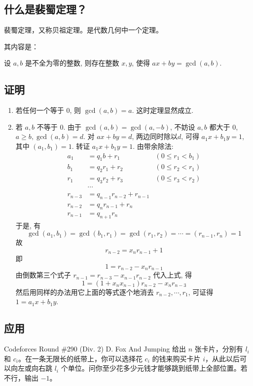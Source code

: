 
\subsection{什么是裴蜀定理？}

裴蜀定理，又称贝祖定理。是代数几何中一个定理。

其内容是：

设 $a,b$ 是不全为零的整数, 则存在整数 $x,y$, 使得 $ax+by=\gcd(a,b)$.

\subsection{证明}

\begin{enumerate}
\item 若任何一个等于 $0$, 则 $\gcd(a,b)=a$. 这时定理显然成立.
\item 若 $a,b$ 不等于 $0$.
由于 $\gcd(a,b)=\gcd(a,-b)$,
不妨设 $a,b$ 都大于 $0$, $a\geq b,\gcd(a,b)=d$.
对 $ax+by=d$, 两边同时除以$d$, 可得 $a_1x+b_1y=1$, 其中 $(a_1,b_1)=1$.
转证 $a_1x+b_1y=1$. 由带余除法:
$$
\begin{aligned}a_1 &= q_1b+r_1 &(0\leq r_1<b_1) \\ b_1 &= q_2r_1+r_2 &(0\leq r_2<r_1) \\ r_1 &= q_3r_2+r_3 &(0\leq r_3<r_2) \\ &\cdots \\ r_{n-3} &= q_{n-1}r_{n-2}+r_{n-1} \\ r_{n-2} &= q_nr_{n-1}+r_n \\ r_{n-1} &= q_{n+1}r_n\end{aligned}
$$
于是, 有
$$
\gcd(a_1,b_1)=\gcd(b_1,r_1)=\gcd(r_1,r_2)=\cdots=(r_{n-1},r_n)=1
$$
故
$$
r_{n-2}=x_nr_{n-1}+1
$$
即
$$
1=r_{n-2}-x_nr_{n-1}
$$
由倒数第三个式子 $r_{n-1}=r_{n-3}-x_{n-1}r_{n-2}$ 代入上式, 得
$$
1=(1+x_nx_{n-1})r_{n-2}-x_nr_{n-3}
$$
然后用同样的办法用它上面的等式逐个地消去 $r_{n-2},\cdots,r_1$,
可证得 $1=a_1x+b_1y$.
\end{enumerate}

\subsection{应用}

\begin{NOTE}{Codeforces Round \#290 (Div. 2) D. Fox And Jumping}{}
给出 $n$ 张卡片，分别有 $l_i$ 和 $c_i$。在一条无限长的纸带上，你可以选择花 $c_i$ 的钱来购买卡片 $i$，从此以后可以向左或向右跳 $l_i$ 个单位。问你至少花多少元钱才能够跳到纸带上全部位置。若不行，输出 $-1$。

\end{NOTE}


